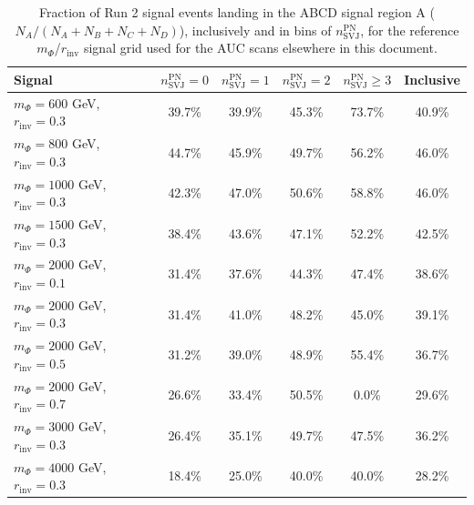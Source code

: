 \begin{table}[htbp]
\centering
\begin{tabular}{|l|c|c|c|c|c|}
    \hline
    Signal & $n_{\mathrm{SVJ}}^{\mathrm{PN}} = 0$ & $n_{\mathrm{SVJ}}^{\mathrm{PN}} = 1$ & $n_{\mathrm{SVJ}}^{\mathrm{PN}} = 2$ & $n_{\mathrm{SVJ}}^{\mathrm{PN}} \geq 3$ & Inclusive \\
    \hline
    $m_{\Phi}=600$ GeV, $r_{\mathrm{inv}}=0.3$ & 39.7\% & 39.9\% & 45.3\% & 73.7\% & 40.9\% \\
    $m_{\Phi}=800$ GeV, $r_{\mathrm{inv}}=0.3$ & 44.7\% & 45.9\% & 49.7\% & 56.2\% & 46.0\% \\
    $m_{\Phi}=1000$ GeV, $r_{\mathrm{inv}}=0.3$ & 42.3\% & 47.0\% & 50.6\% & 58.8\% & 46.0\% \\
    $m_{\Phi}=1500$ GeV, $r_{\mathrm{inv}}=0.3$ & 38.4\% & 43.6\% & 47.1\% & 52.2\% & 42.5\% \\
    $m_{\Phi}=2000$ GeV, $r_{\mathrm{inv}}=0.1$ & 31.4\% & 37.6\% & 44.3\% & 47.4\% & 38.6\% \\
    $m_{\Phi}=2000$ GeV, $r_{\mathrm{inv}}=0.3$ & 31.4\% & 41.0\% & 48.2\% & 45.0\% & 39.1\% \\
    $m_{\Phi}=2000$ GeV, $r_{\mathrm{inv}}=0.5$ & 31.2\% & 39.0\% & 48.9\% & 55.4\% & 36.7\% \\
    $m_{\Phi}=2000$ GeV, $r_{\mathrm{inv}}=0.7$ & 26.6\% & 33.4\% & 50.5\% & 0.0\% & 29.6\% \\
    $m_{\Phi}=3000$ GeV, $r_{\mathrm{inv}}=0.3$ & 26.4\% & 35.1\% & 49.7\% & 47.5\% & 36.2\% \\
    $m_{\Phi}=4000$ GeV, $r_{\mathrm{inv}}=0.3$ & 18.4\% & 25.0\% & 40.0\% & 40.0\% & 28.2\% \\
    \hline
\end{tabular}
\caption{Fraction of Run 2 signal events landing in the ABCD signal region A ($N_A / (N_A+N_B+N_C+N_D)$), inclusively and in bins of $n_{\mathrm{SVJ}}^{\mathrm{PN}}$, for the reference $m_{\Phi}$/$r_{\mathrm{inv}}$ signal grid used for the AUC scans elsewhere in this document.}
\label{table:signal_region_a_acceptance}
\end{table}
